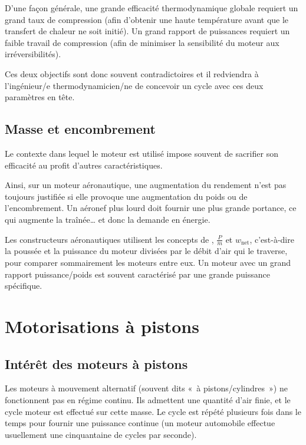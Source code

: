 		D’une façon générale, une grande efficacité thermodynamique globale requiert un grand taux de compression (afin d’obtenir une haute température avant que le transfert de chaleur ne soit initié). Un grand rapport de puissances requiert un faible travail de compression (afin de minimiser la sensibilité du moteur aux irréversibilités).

		Ces deux objectifs sont donc souvent contradictoires et il redviendra à l’ingénieur/e thermodynamicien/ne de concevoir un cycle avec ces deux paramètres en tête.

		 

	\subsection{Masse et encombrement}

		Le contexte dans lequel le moteur est utilisé impose souvent de sacrifier son efficacité au profit d’autres caractéristiques.

		Ainsi, sur un moteur aéronautique, une augmentation du rendement n’est pas toujours justifiée si elle provoque une augmentation du poids ou de l’encombrement. Un aéronef plus lourd doit fournir une plus grande portance, ce qui augmente la traînée… et donc la demande en énergie.

		Les constructeurs aéronautiques utilisent les concepts de , $\frac{P}{\dot m}$ et $w_\text{net}$, c’est-à-dire la poussée et la puissance du moteur divisées par le débit d’air qui le traverse, pour comparer sommairement les moteurs entre eux. Un moteur avec un grand rapport puissance/poids est souvent caractérisé par une grande puissance spécifique.



\section{Motorisations à pistons}



	\subsection{Intérêt des moteurs à pistons}

		Les moteurs à mouvement alternatif (souvent dits «~à pistons/cylindres~») ne fonctionnent pas en régime continu. Ils admettent une quantité d’air finie, et le cycle moteur est effectué sur cette masse. Le cycle est répété plusieurs fois dans le temps pour fournir une puissance continue (un moteur automobile effectue usuellement une cinquantaine de cycles par seconde).

